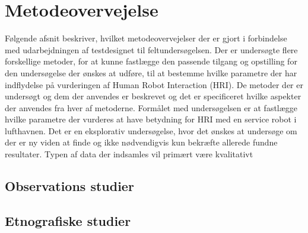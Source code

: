 \section{Metodeovervejelse}
\label{ParametreMetodeovervejelser}
%
Følgende afsnit beskriver, hvilket metodeovervejelser der er gjort i forbindelse med udarbejdningen af testdesignet til feltundersøgelsen. Der er undersøgte flere forskellige metoder, for at kunne fastlægge den passende tilgang og opstilling for den undersøgelse der ønskes at udføre, til at bestemme hvilke parametre der har indflydelse på vurderingen af Human Robot Interaction (HRI). De metoder der er undersøgt og dem der anvendes er beskrevet og det er specificeret hvilke aspekter der anvendes fra hver af metoderne. \blankline
%
Formålet med undersøgelsen er at fastlægge hvilke parametre der vurderes at have betydning for HRI med en service robot i lufthavnen. Det er en eksplorativ undersøgelse, hvor det ønskes at undersøge om der er ny viden at finde og ikke nødvendigvis kun bekræfte allerede fundne resultater. 
Typen af data der indsamles vil primært være kvalitativt 
%
\subsection{Observations studier}
\label{ParametreObservationsStudier}

\subsection{Etnografiske studier}
\label{ParametreEtnografiskeStudier}

